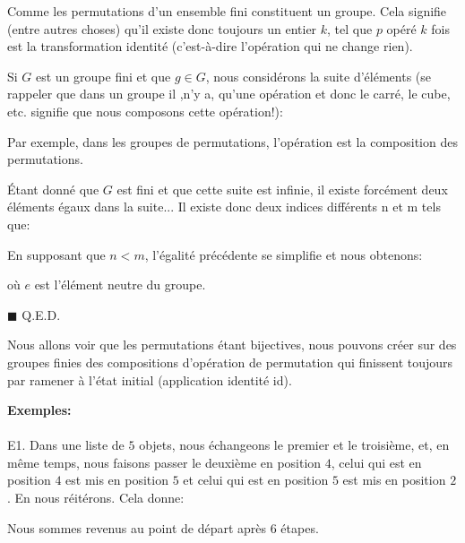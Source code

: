 	\begin{theorem}
	Comme les permutations d'un ensemble fini constituent un groupe. Cela signifie (entre autres choses) qu'il existe donc toujours un entier $k$, tel que $p$ opéré $k$ fois est la transformation identité (c'est-à-dire l'opération qui ne change rien).
	\end{theorem}
	\begin{dem}
	Si $G$ est un groupe fini et que $g\in G$, nous considérons la suite d'éléments (se rappeler que dans un groupe il ,n'y a, qu'une opération et donc le carré, le cube, etc. signifie que nous composons cette opération!):
	
	Par exemple, dans les groupes de permutations, l'opération est la composition des permutations.
	
	Étant donné que $G$ est fini et que cette suite est infinie, il existe forcément deux éléments égaux dans la suite... Il existe donc deux indices différents n et m tels que:
	
	En supposant que $n<m$, l'égalité précédente se simplifie et nous obtenons:
	
	où $e$ est l'élément neutre du groupe.
	\begin{flushright}
		$\blacksquare$  Q.E.D.
	\end{flushright}
	\end{dem}
	Nous allons voir que les permutations étant bijectives, nous pouvons créer sur des groupes finies des compositions d'opération de permutation qui finissent toujours par ramener à l'état initial (application identité id).
	\begin{tcolorbox}[colframe=black,colback=white,sharp corners]
	\textbf{{\Large {}}Exemples:}\\\\
	E1. Dans une liste de $5$ objets, nous échangeons le premier et le troisième, et, en même temps, nous faisons passer le deuxième en position $4$, celui qui est en position $4$ est mis en position $5$ et celui qui est en position $5$ est mis en position $2$. En nous réitérons. Cela donne:
	
	Nous sommes revenus au point de départ après $6$ étapes.
	\end{tcolorbox}
	
